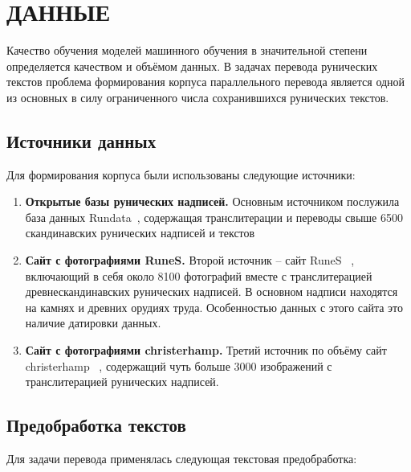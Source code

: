 \documentclass[14pt,a4paper]{extreport}
\begin{document}
\chapter{ДАННЫЕ}

Качество обучения моделей машинного обучения в значительной степени определяется качеством и объёмом данных. В задачах перевода рунических текстов проблема формирования корпуса параллельного перевода является одной из основных в силу ограниченного числа сохранившихся рунических текстов.

\section{Источники данных}

Для формирования корпуса были использованы следующие источники:

\begin{enumerate}
    \item \textbf{Открытые базы рунических надписей.} Основным источником послужила база данных Rundata~\cite{rundata}, содержащая транслитерации и переводы свыше 6500 скандинавских рунических надписей и текстов

    \item \textbf{Сайт с фотографиями RuneS.} Второй источник -- сайт RuneS ~\cite{runes}, включающий в себя около 8100 фотографий вместе с транслитерацией древнескандинавских рунических надписей. В основном надписи находятся на камнях и древних орудиях труда. Особенностью данных с этого сайта это наличие датировки данных.

    \item \textbf{Сайт с фотографиями christerhamp.} Третий источник по объёму сайт christerhamp ~\cite{christerhamp}, содержащий чуть больше 3000 изображений с транслитерацией рунических надписей.
    
\end{enumerate}


\section{Предобработка текстов}

Для задачи перевода применялась следующая текстовая предобработка:
\end{document}
